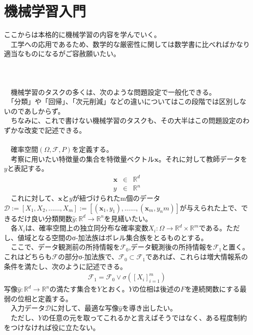 \documentclass{jsarticle}
\begin{document}
\section{機械学習入門}
ここからは本格的に機械学習の内容を学んでいく。\\
　工学への応用であるため、数学的な厳密性に関しては数学書に比べればかなり適当なものになるがご容赦願いたい。\\
　\\
　\\
\scalebox{1.1}{1.問題設定}\\
　機械学習のタスクの多くは、次のような問題設定で一般化できる。\\
　「分類」や「回帰」、「次元削減」などの違いについてはこの段階では区別しないのであしからず。\\
　ちなみに、これで書けない機械学習のタスクも、その大半はこの問題設定のわずかな改変で記述できる。\\
　\\
　確率空間$(\Omega,\mathcal{F},P)$を定義する。\\
　考察に用いたい特徴量の集合を特徴量ベクトル$\bm{x}$。それに対して教師データを$y$と表記する。
\begin{eqnarray}
\bm{x}&\in & \mathbb{R}^d\nonumber\\
y&\in&\mathbb{R}^n\nonumber
\end{eqnarray}
　これに対して、$\bm{x}$と$y$が紐づけられたm個のデータ$\mathcal{D}:=[X_1,X_2,......,X_m]:=[(\bm{x}_1,y_1),......,(\bm{x}_m,y_nm)]$が与えられた上で、できるだけ良い分類関数$\hat{y}:\mathbb{R}^d\rightarrow \mathbb{R}^n$を見繕いたい。\\
　各$X_i$は、確率空間上の独立同分布な確率変数$X_i:\Omega\rightarrow \mathbb{R}^d\times \mathbb{R}^m$である。ただし、値域となる空間のσ-加法族はボレル集合族をとるものとする。\\
　ここで、データ観測前の所持情報を$\mathcal{F}_0$,データ観測後の所持情報を$\mathcal{F}_1$と置く。これはどちらも$\mathcal{F}$の部分σ-加法族で、$\mathcal{F}_0\subset\mathcal{F}_1$であれば、これらは増大情報系の条件を満たし、次のように記述できる。
\begin{eqnarray}
\mathcal{F}_1=\mathcal{F}_0\vee\sigma([X_i]^m_{i=1})
\end{eqnarray}
写像$\hat{y}:\mathbb{R}^d\rightarrow \mathbb{R}^n$の満たす集合を$Y$とおく。$Y$の位相は後述の$F$を連続関数にする最弱の位相と定義する。\\
　入力データ$\mathcal{D}$に対して、最適な写像$\hat{y}$を導き出したい。\\
　ただし、$Y$の任意の元を取ってこれるかと言えばそうではなく、ある程度制約をつけなければ役に立たない。\\
\end{document}
